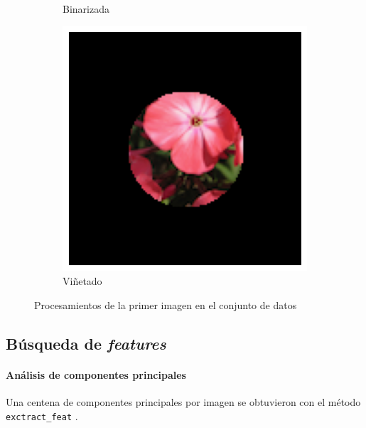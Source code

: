 \documentclass{article}
\begin{document}
\begin{figure}
\begin{subfigure}[b]{0.24\textwidth}
		\caption{Binarizada}
		\label{fg:imgGrau0binarizada}
	\end{subfigure}
	\begin{subfigure}[b]{0.24\textwidth}
		\includegraphics[width= \textwidth]{circle}
		\caption{Viñetado}
		\label{fg:circle}
	\end{subfigure}
	\caption{Procesamientos de la primer imagen en el conjunto de datos}
\end{figure}



\subsection{Búsqueda de \emph{features}}



\paragraph{Análisis de componentes principales}
Una centena de componentes principales por imagen se obtuvieron con el método \verb'exctract_feat' \cite{taskesen_pca_2020}.
\end{document}
